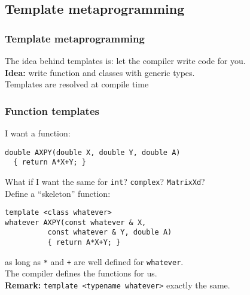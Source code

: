 \documentclass{beamer}
\newcommand{\code}[1]{{\color{cgreen}\texttt{#1}}}
\begin{document}
\subsection{Template metaprogramming}

\begin{frame}[fragile]
 \frametitle{Template metaprogramming}
 The idea behind templates is: let the compiler write code for you. \\
 \textbf{Idea:} write function and classes with generic types. \\
 Templates are resolved at compile time
\end{frame}

\begin{frame}[fragile]
 \frametitle{Function templates}
 I want a function:
 \begin{lstlisting}
double AXPY(double X, double Y, double A)
  { return A*X+Y; }
 \end{lstlisting}
 What if I want the same for \code{int}? \code{complex}? \code{MatrixXd}? \\
 Define a ``skeleton'' function:
 \begin{lstlisting}
template <class whatever>
whatever AXPY(const whatever & X,
	      const whatever & Y, double A)
	      { return A*X+Y; }
 \end{lstlisting}
 as long as \code{*} and \code{+} are well defined for \code{whatever}. \\
 The compiler defines the functions for us. \\
 \textbf{Remark:} \code{template <typename whatever>} exactly the same.
\end{frame}
\end{document}
